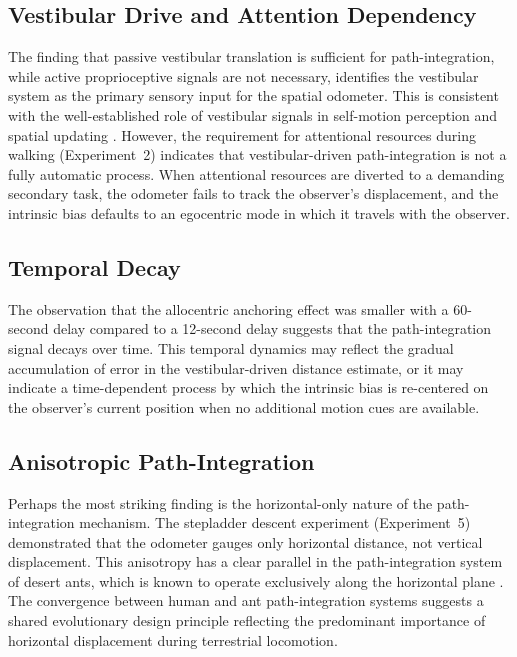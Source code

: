 \documentclass[12pt]{article}
\begin{document}
\subsection{Vestibular Drive and Attention Dependency}

The finding that passive vestibular translation is sufficient for path-integration, while active proprioceptive signals are not necessary, identifies the vestibular system as the primary sensory input for the spatial odometer. This is consistent with the well-established role of vestibular signals in self-motion perception and spatial updating \citep{angelaki2008, glasauer2005}. However, the requirement for attentional resources during walking (Experiment~2) indicates that vestibular-driven path-integration is not a fully automatic process. When attentional resources are diverted to a demanding secondary task, the odometer fails to track the observer's displacement, and the intrinsic bias defaults to an egocentric mode in which it travels with the observer.

\subsection{Temporal Decay}

The observation that the allocentric anchoring effect was smaller with a 60-second delay compared to a 12-second delay suggests that the path-integration signal decays over time. This temporal dynamics may reflect the gradual accumulation of error in the vestibular-driven distance estimate, or it may indicate a time-dependent process by which the intrinsic bias is re-centered on the observer's current position when no additional motion cues are available.

\subsection{Anisotropic Path-Integration}

Perhaps the most striking finding is the horizontal-only nature of the path-integration mechanism. The stepladder descent experiment (Experiment~5) demonstrated that the odometer gauges only horizontal distance, not vertical displacement. This anisotropy has a clear parallel in the path-integration system of desert ants, which is known to operate exclusively along the horizontal plane \citep{wohlgemuth2001, wintergerst2017}. The convergence between human and ant path-integration systems suggests a shared evolutionary design principle reflecting the predominant importance of horizontal displacement during terrestrial locomotion.
\end{document}
